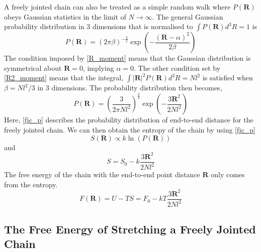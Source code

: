 A freely jointed chain can also be treated as a simple random walk where $P(\mathbf{R})$ obeys Gaussian statistics in the limit of $N \to \infty$. The general Gaussian probability distribution in 3 dimensions that is normalised to $\int P(\mathbf{R})d^{3}R=1$ is
%
\begin{equation}
\label{gaussian_probability_distribution}
P(\mathbf{R})= (2\pi \beta)^{-\frac{3}{2}}\exp\left(-\frac{(\mathbf{R}-\alpha)^2}{2\beta}\right)
\end{equation} 
%
The condition imposed by \eqref{R_moment} means that the Gaussian distribution is symmetrical about $\mathbf{R}=0$, implying $\alpha =0$. The other condition set by \eqref{R2_moment} means  that the integral, $\int |\mathbf{R}|^2 P(\mathbf{R}) d^{3}R=Nl^{2}$ is satisfied when $\beta = Nl^{2}/3$ in 3 dimensions. The probability distribution then becomes,
%
\begin{equation}\label{fjc_p}
P(\mathbf{R})=\left(\frac{3}{2\pi N l^2}\right)^{\frac{3}{2}}\exp\left(-\frac{3\mathbf{R}^{2}}{2N l^{2}} \right)
\end{equation}
%
Here, \eqref{fjc_p} describes the probability distribution of end-to-end distance for the freely jointed chain. We can then obtain the entropy of the chain by using \eqref{fjc_p}
%
\begin{equation}
S\left(\mathbf{R}\right) \propto k\ln\left(P(\mathbf{R})\right)
\end{equation}
%
and
%
\begin{equation}\label{fjc_entropy}
S = S_{0}-k\frac{3\mathbf{R}^{2}}{2Nl^{2}}
\end{equation}
%
The free energy of the chain with the end-to-end point distance $\mathbf{R}$ only comes from the entropy.
%
\begin{equation}\label{fjc_fe}
F(\mathbf{R})=U-TS=F_{0}-kT\frac{3\mathbf{R}^{2}}{2Nl^{2}}
\end{equation}
%
\subsection{The Free Energy of Stretching a Freely Jointed Chain}

